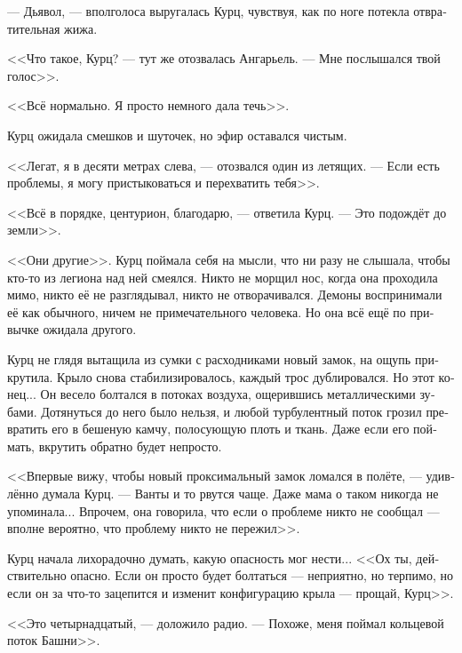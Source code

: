 \documentclass[a4paper,12pt,fleqn]{book}\usepackage{polyglossia}\setdefaultlanguage[babelshorthands=true]{russian}\setotherlanguage{english}\defaultfontfeatures{Ligatures=TeX,Mapping=tex-text}\usepackage{xcolor}\newcommand{\ml}[3]{#2}
\begin{document}
--- Дьявол, --- вполголоса выругалась Курц, чувствуя, как по ноге потекла отвратительная жижа.

\ml{$0$}
{<<Что такое, Курц? --- тут же отозвалась Ангарьель.}
{``Whazzup, Kurz?'' Angariel immediately answered.}
\ml{$0$}
{--- Мне послышался твой голос>>.}
{``I thought I heard your voice.''}

\ml{$0$}
{<<Всё нормально.}
{``I'm all right.}
\ml{$0$}
{Я просто немного дала течь>>.}
{Just sprung a leak.''}

Курц ожидала смешков и шуточек, но эфир оставался чистым.

<<Легат, я в десяти метрах слева, --- отозвался один из летящих.
--- Если есть проблемы, я могу пристыковаться и перехватить тебя>>.

<<Всё в порядке, центурион, благодарю, --- ответила Курц.
--- Это подождёт до земли>>.

\ml{$0$}
{<<Они другие>>.}
{They're different.}
Курц поймала себя на мысли, что ни разу не слышала, чтобы кто-то из легиона над ней смеялся.
Никто не морщил нос, когда она проходила мимо, никто её не разглядывал, никто не отворачивался.
Демоны воспринимали её как обычного, ничем не примечательного человека.
Но она всё ещё по привычке ожидала другого.

Курц не глядя вытащила из сумки с расходниками новый замок, на ощупь прикрутила.
Крыло снова стабилизировалось, каждый трос дублировался.
Но этот конец...
Он весело болтался в потоках воздуха, ощерившись металлическими зубами.
Дотянуться до него было нельзя, и любой турбулентный поток грозил превратить его в бешеную камчу, полосующую плоть и ткань.
Даже если его поймать, вкрутить обратно будет непросто.

<<Впервые вижу, чтобы новый проксимальный замок ломался в полёте, --- удивлённо думала Курц.
--- Ванты и то рвутся чаще.
Даже мама о таком никогда не упоминала...
\ml{$0$}
{Впрочем, она говорила, что если о проблеме никто не сообщал --- вполне вероятно, что проблему никто не пережил>>.}
{\textit{She told, however, if the problem were not reported, the problem more than likely were not outlived.}}

Курц начала лихорадочно думать, какую опасность мог нести...
<<Ох ты, действительно опасно.
Если он просто будет болтаться --- неприятно, но терпимо, но если он за что-то зацепится и изменит конфигурацию крыла --- прощай, Курц>>.

<<Это четырнадцатый, --- доложило радио.
--- Похоже, меня поймал кольцевой поток Башни>>.
\end{document}
